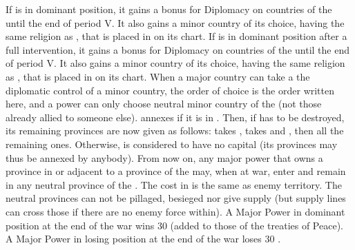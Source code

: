 \begin{digressions}
  \aparag[England] If \ENG is in dominant position, it gains a 
  bonus for Diplomacy on countries of the \HRE until the end of period V.  It
  also gains a minor country of its choice, having the same religion as \ENG,
  that is placed in \EG on its chart.
  \aparag[Poland] If \POL is in dominant position after a full intervention,
  it gains a  bonus for Diplomacy on countries of the \HRE until the
  end of period V.  It also gains a minor country of its choice, having the
  same religion as \POL, that is placed in \EG on its chart.
  \aparag When a major country can take a the diplomatic control of a minor
  country, the order of choice is the order written here, and a power can only
  choose neutral minor country of the \HRE (not those already allied to
  someone else).
  \aparag \paysBrandebourg annexes  if it is in
  \paysHanse.
  \aparag Then, if \paysHanse has to be destroyed, its remaining provinces are
  now given as follows: \SUE takes \provinceBremen, \paysBrandebourg takes
   and \provinceMecklenburg, then \DANmin all the
  remaining ones.
  \bparag Otherwise, \paysHanse is considered to have no capital (its
  provinces may thus be annexed by anybody).
  \aparag From now on, any major power that owns a province in \HRE or
  adjacent to a province of the \HRE may, when at war, enter and remain in any
  neutral province of the \HRE. The cost in \MP is the same as enemy
  territory. The neutral provinces can not be pillaged, besieged nor give
  supply (but supply lines can cross those if there are no enemy force
  within).
  \bparag
  \bparag A Major Power in dominant position at the end of the war wins 30 \PV
  (added to those of the treaties of Peace).
  \bparag A Major Power in losing position at the end of the war loses 30 \PV.
\end{digressions}

